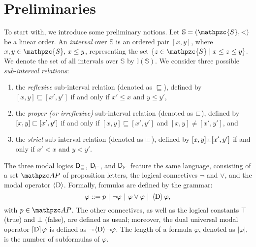 \section{Preliminaries}\label{sec:preliminaries}

To start with, we introduce some preliminary notions.
Let $\mathbb{S} = (\mathpzc{S}, <)$ be a  linear order. An
\emph{interval} over $\mathbb{S}$ is an ordered pair $[x, y]$,
where $x,y\in \mathpzc{S},\, x \leq y$, representing the set $\{z\in \mathpzc{S}\mid x\leq z\leq y\}$. We denote the set of all intervals over
$\mathbb{S}$ by $\mathbb{I(S)}$.
%
We consider three possible \emph{sub-interval relations}: 
\begin{enumerate}
    \item the \emph{reflexive} sub-interval relation (denoted as
    $\sqsubseteq$), defined by $[x, y] \sqsubseteq [x', y']$ if and only if
    $x' \leq x$ and $y\leq y'$,
    \item the \emph{proper (or
    irreflexive)} sub-interval relation (denoted as $\sqsubset$), defined
    by $[x, y]\sqsubset  [x', y']$ if and only if $[x, y] \sqsubseteq
    [x', y']$ and $[x, y] \neq [x', y']$, and 
    \item the \emph{strict}
    sub-interval relation (denoted as $\ssubint$), defined by 
    $[x, y] \ssubint [x', y'] $ if and only if $x' < x$ and $y<y'$.
\end{enumerate}

The three modal logics $\textsf{D$_\sqsubseteq$}$, $\textsf{D$_\sqsubset$}$, and $\Dstr$ feature the same
language, consisting of a set $\AP$ of proposition
letters, the logical connectives $\neg$ and $\vee$, and the
modal operator $\operatorname{\langle D\rangle}$. Formally, formulas are
defined by the grammar: \[\varphi ::= p \ |\ \neg\varphi\ |\ \varphi \vee \varphi\ |\ \operatorname{\langle D\rangle} \varphi,\]
with $p\in\AP$.
The other connectives, as well as
the logical constants $\top$ (true) and $\bot$ (false), are defined as usual; moreover, the
dual universal modal operator $\operatorname{\mathopen[ D \mathclose]}\varphi$ is defined as $\neg\operatorname{\langle D\rangle}\neg\varphi$. The length of a formula
$\varphi$, denoted as $|\varphi|$, is the number of subformulas of $\varphi$.

